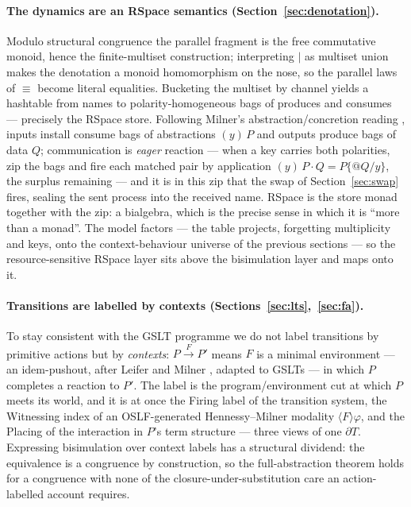 \documentclass[11pt]{article}
\makeatletter
\newcommand{\Par}{\mathbin{\mid}}
\newcommand{\quo}[1]{@#1}
\newcommand{\abs}[2]{(#1)\,#2}                  %
\newcommand{\lts}[1]{\xrightarrow{\,#1\,}}
\newcommand{\scong}{\equiv}
\theoremstyle{plain}
\theoremstyle{definition}
\makeatother
\begin{document}
\paragraph{The dynamics are an RSpace semantics (Section~\ref{sec:denotation}).}
Modulo structural congruence the parallel fragment is the free commutative monoid,
hence the finite-multiset construction; interpreting $\Par$ as multiset union makes
the denotation a monoid homomorphism on the nose, so the parallel laws of $\scong$
become literal equalities. Bucketing the multiset by channel yields a hashtable
from names to polarity-homogeneous bags of produces and consumes --- precisely the
RSpace store. Following Milner's abstraction/concretion reading \cite{polyadic},
inputs install consume bags of abstractions $\abs y P$ and outputs produce bags of
data $Q$; communication is \emph{eager} reaction --- when a key carries both
polarities, zip the bags and fire each matched pair by application
$\abs y P\cdot Q=P\{\quo Q/y\}$, the surplus remaining --- and it is in this zip
that the swap of Section~\ref{sec:swap} fires, sealing the sent process into the
received name. RSpace is the store monad together with the zip: a bialgebra, which
is the precise sense in which it is ``more than a monad''. The model factors ---
the table projects, forgetting multiplicity and keys, onto the context-behaviour
universe of the previous sections --- so the resource-sensitive RSpace layer sits
above the bisimulation layer and maps onto it.

\paragraph{Transitions are labelled by contexts (Sections~\ref{sec:lts},~\ref{sec:fa}).}
To stay consistent with the GSLT programme we do not label transitions by primitive
actions but by \emph{contexts}: $P\lts F P'$ means $F$ is a minimal environment ---
an idem-pushout, after Leifer and Milner \cite{leifermilner,sewell}, adapted to
GSLTs \cite{meredithwells} --- in which $P$ completes a reaction to $P'$. The label
is the program/environment cut at which $P$ meets its world, and it is at once the
Firing label of the transition system, the Witnessing index of an OSLF-generated
Hennessy--Milner modality $\langle F\rangle\varphi$, and the Placing of the
interaction in $P$'s term structure --- three views of one $\partial T$. Expressing
bisimulation over context labels has a structural dividend: the equivalence is a
congruence by construction, so the full-abstraction theorem holds for a congruence
with none of the closure-under-substitution care an action-labelled account
requires.
\end{document}
